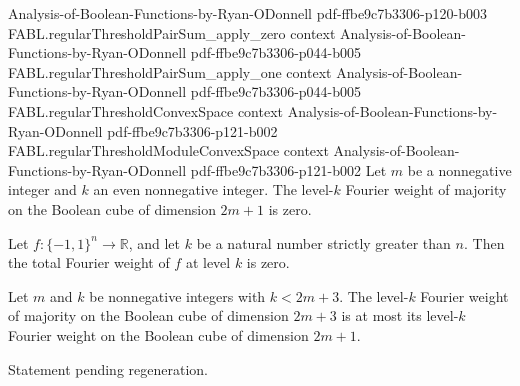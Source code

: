 \begin{theorem}
  {Analysis-of-Boolean-Functions-by-Ryan-ODonnell}
  {pdf-ffbe9c7b3306-p120-b003}
\proofstep
  {FABL.regularThresholdPairSum_apply_zero}
  {context}
  {Analysis-of-Boolean-Functions-by-Ryan-ODonnell}
  {pdf-ffbe9c7b3306-p044-b005}
\proofstep
  {FABL.regularThresholdPairSum_apply_one}
  {context}
  {Analysis-of-Boolean-Functions-by-Ryan-ODonnell}
  {pdf-ffbe9c7b3306-p044-b005}
\proofstep
  {FABL.regularThresholdConvexSpace}
  {context}
  {Analysis-of-Boolean-Functions-by-Ryan-ODonnell}
  {pdf-ffbe9c7b3306-p121-b002}
\proofstep
  {FABL.regularThresholdModuleConvexSpace}
  {context}
  {Analysis-of-Boolean-Functions-by-Ryan-ODonnell}
  {pdf-ffbe9c7b3306-p121-b002}
Let $m$ be a nonnegative integer and $k$ an even nonnegative integer. The level-$k$
Fourier weight of majority on the Boolean cube of dimension $2m+1$ is zero.
\end{theorem}

\begin{theorem}
\label{FABL.fourierWeightAtLevel_eq_zero_of_dimension_lt}
\leanok
{}
Let $f:\{-1,1\}^n\to\mathbb R$, and let $k$ be a natural number strictly greater than
$n$. Then the total Fourier weight of $f$ at level $k$ is zero.
\end{theorem}

\begin{theorem}
\label{FABL.fourierWeightAtLevel_majority_next_odd_le_of_lt_top}
\leanok
{}
Let $m$ and $k$ be nonnegative integers with $k<2m+3$. The level-$k$ Fourier weight of
majority on the Boolean cube of dimension $2m+3$ is at most its level-$k$ Fourier weight
on the Boolean cube of dimension $2m+1$.
\end{theorem}

\begin{theorem}
\label{FABL.noiseStability_majority_next_odd_comparison}
\leanok
{}
Statement pending regeneration.
\end{theorem}


